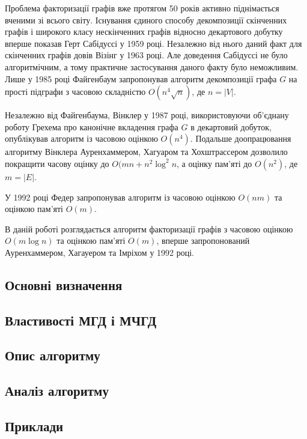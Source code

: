 Проблема факторизації графів вже протягом 50 років активно піднімається вченими зі всього світу.
Існування єдиного способу декомпозиції скінченних графів і широкого класу нескінченних графів відносно декартового добутку вперше показав Герт Сабідуссі у 1959 році\cite{sabidussi1959gm}.
Незалежно від нього даний факт для скінченних графів довів Візінг у 1963 році\cite{vizing1963cpf}.
Але доведення Сабідуссі не було алгоритмічним, а тому практичне застосування даного факту було неможливим.
Лише у 1985 році Файгенбаум запропонував алгоритм декомпозиції графа $G$ на прості підграфи з часовою складністю $O(n^4\sqrt n)$, де $n=\vert V \vert$\cite{feigenbaum1985ptafpfcpg}.

Незалежно від Файгенбаума, Вінклер у 1987 році, використовуючи об'єднану роботу Грехема про канонічне вкладення графа $G$ в декартовий добуток, опублікував алгоритм із часовою оцінкою $O(n^4)$.
Подальше доопрацювання алгоритму Вінклера Ауренхаммером, Хагуаром та Хох\-штрассером дозволило покращити часову оцінку до $O(mn+n^2\log^2n$, а оцінку пам'яті до $O(n^2)$, де $m=\vert E \vert$.

У 1992 році Федер запропонував алгоритм із часовою оцінкою $O(nm)$ та оцінкою пам'яті $O(m)$\cite{feder1992pgr}.

В даній роботі розглядається алгоритм факторизації графів з часовою оцінкою $O(m\log n)$ та оцінкою пам'яті $O(m)$, вперше запропонований Ауренхаммером, Хагауером та Імріхом у 1992 році\cite{aurenhammer1992cgflce}.

\newpage
\subsection{Основні визначення}


\newpage
\subsection{Властивості МГД і МЧГД}


\newpage
\subsection{Опис алгоритму}


\newpage
\subsection{Аналіз алгоритму}


\newpage
\subsection{Приклади}

